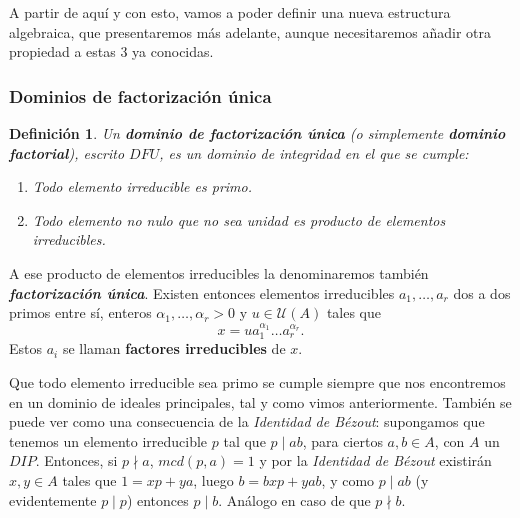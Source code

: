 \documentclass[12pt]{article}
\newtheorem{definition}[theorem]{Definición}
\begin{document}
A partir de aquí y con esto, vamos a poder definir una nueva estructura algebraica, que presentaremos más adelante, aunque necesitaremos añadir otra propiedad a estas 3 ya conocidas.

\subsubsection{Dominios de factorización única}

\begin{definition}\label{eq:defdfu} Un \textbf{dominio de factorización única} (o simplemente \textbf{dominio factorial}), escrito $DFU$, es un dominio de integridad en el que se cumple: \begin{enumerate}
\item Todo elemento irreducible es primo.
\item Todo elemento no nulo que no sea unidad es producto de elementos irreducibles.
\end{enumerate}
\end{definition}

A ese producto de elementos irreducibles la denominaremos también \textbf{\textit{factorización única}}. Existen entonces elementos irreducibles $a_{1}, \ldots, a_{r}$ dos a dos primos entre sí, enteros $\alpha_{1}, \ldots, \alpha_{r} > 0$ y $u \in \mathcal{U}(A)$ tales que $$x = ua_{1}^{\alpha_{1}}\ldots a_{r}^{\alpha_{r}}.$$ Estos $a_{i}$ se llaman \textbf{factores irreducibles} de $x$.

Que todo elemento irreducible sea primo se cumple siempre que nos encontremos en un dominio de ideales principales, tal y como vimos anteriormente. También se puede ver como una consecuencia de la \textit{Identidad de Bézout}: supongamos que tenemos un elemento irreducible $p$ tal que $p \mid ab$, para ciertos $a,b \in A$, con $A$ un $DIP$. Entonces, si $p \nmid a$, $mcd(p,a)=1$ y por la \textit{Identidad de Bézout} existirán $x,y \in A$ tales que $1 = xp + ya$, luego $b = bxp + yab$, y como $p \mid ab$ (y evidentemente $p \mid p$) entonces $p \mid b$. Análogo en caso de que $p \nmid b$.
\end{document}
